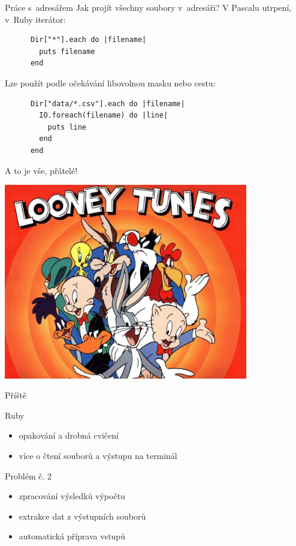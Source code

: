 \documentclass{beamer}
\begin{document}
\begin{frame}[fragile]{Práce s~adresářem}
  Jak projít všechny soubory v~adresáři? V Pascalu utrpení, v~Ruby iterátor:
  \begin{block}{}
    {\scriptsize \begin{verbatim}
      Dir["*"].each do |filename|
        puts filename
      end
    \end{verbatim}}
  \end{block}
  \pause
  Lze použít podle očekávání libovolnou masku nebo cestu:
  \begin{block}{}
    {\scriptsize \begin{verbatim}
      Dir["data/*.csv"].each do |filename|
        IO.foreach(filename) do |line|
          puts line
        end
      end
    \end{verbatim}}
  \end{block}
\end{frame}

\begin{frame}{A to je vše, přátelé!}
  \begin{center}
    \includegraphics[width=0.8\textwidth]{looney_tunes}
  \end{center}
\end{frame}

\begin{frame}{Příště}
  \begin{block}{Ruby}
    \begin{itemize}
      \item opakování a drobná cvičení
      \item více o čtení souborů a výstupu na terminál
    \end{itemize}
  \end{block}
  \begin{block}{Problém č. 2}
    \begin{itemize}
      \item zpracování výsledků výpočtu
      \item extrakce dat z výstupních souborů
      \item automatická příprava vstupů
    \end{itemize}
  \end{block}
\end{frame}
\end{document}
